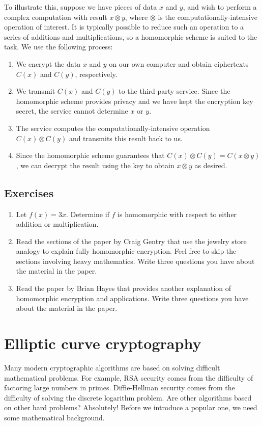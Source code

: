 \documentclass{book}
\theoremstyle{plain}
\theoremstyle{definition}
\newif\ifprintsolutions
\newcommand{\solution}[1]{\ifprintsolutions \begin{sloppypar}{\it #1}\end{sloppypar} \fi} %
\begin{document}
To illustrate this, suppose we have pieces of data $x$ and $y$, and wish to perform a complex computation with result $x \otimes y$, where $\otimes$ is the computationally-intensive operation of interest. It is typically possible to reduce such an operation to a series of additions and multiplications, so a homomorphic scheme is suited to the task. We use the following process:
\begin{enumerate}
\item We encrypt the data $x$ and $y$ on our own computer and obtain ciphertexts $C(x)$ and $C(y)$, respectively.
\item We transmit $C(x)$ and $C(y)$ to the third-party service. Since the homomorphic scheme provides privacy and we have kept the encryption key secret, the service cannot determine $x$ or $y$.
\item The service computes the computationally-intensive operation $C(x) \otimes C(y)$ and transmits this result back to us.
\item Since the homomorphic scheme guarantees that $C(x) \otimes C(y) = C(x \otimes y)$, we can decrypt the result using the key to obtain $x \otimes y$ as desired.
\end{enumerate}

\section{Exercises}
\begin{enumerate}
\item Let $f(x) = 3x$. Determine if $f$ is homomorphic with respect to either addition or multiplication. \solution{Since $f(x+y) = 3(x+y) = 3x+3y = f(x) + f(y)$, the function is homomorphic with respect to addition. However, it is not homomorphic with respect to multiplication since $f(xy) = 3xy \neq (3x)(3y) = f(x)f(y)$ in general.}
\item Read the sections of the paper \cite{gentry} by Craig Gentry that use the jewelry store analogy to explain fully homomorphic encryption. Feel free to skip the sections involving heavy mathematics. Write three questions you have about the material in the paper.
\item Read the paper \cite{hayes} by Brian Hayes that provides another explanation of homomorphic encryption and applications. Write three questions you have about the material in the paper.
\end{enumerate}

\chapter{Elliptic curve cryptography}
Many modern cryptographic algorithms are based on solving difficult mathematical problems. For example, RSA security comes from the difficulty of factoring large numbers in primes. Diffie-Hellman security comes from the difficulty of solving the discrete logarithm problem. Are other algorithms based on other hard problems? Absolutely! Before we introduce a popular one, we need some mathematical background.
\end{document}
